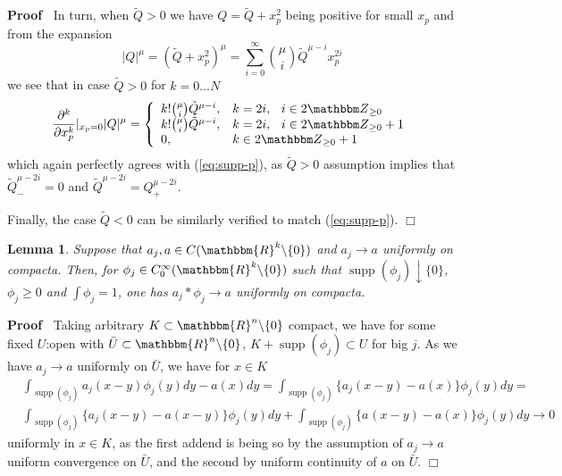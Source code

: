 \documentclass{article}
\newcommand{\tmop}[1]{\ensuremath{\operatorname{#1}}}
\newenvironment{proof}{\noindent\textbf{Proof\ }}{\hspace*{\fill}$\Box$\medskip}
\numberwithin{definition}{section}
\newtheorem{lemma}{Lemma}
\numberwithin{lemma}{section}
\numberwithin{proposition}{section}
{\theorembodyfont{\rmfamily}\newtheorem{remark}{Remark}
\numberwithin{remark}{section}
}
\newcommand{\mybra}[1]{(#1)} \newcommand{\mysbra}[1]{\left[#1\right]}
\begin{document}
\begin{proof}
  In turn, when $\tilde{Q} > 0$ we have $Q = \tilde{Q} + x_p^2$ being positive
  for small $x_p$ and from the expansion
  \[ | Q |^{\mu} = \mybra{\tilde{Q} + x_p^2}^{\mu} = \sum_{i = 0}^{\infty}
     \binom{\mu}{i} \tilde{Q}^{\mu - i} x_p^{2 i} \]
  we see that in case $\tilde{Q} > 0$ for $k = 0 \ldots N$
  \[ \frac{\partial^k}{\partial x_p^k} |_{x_p = 0} | Q |^{\mu} = \left\{
     \begin{array}{ll}
       k! \binom{\mu}{i} \tilde{Q}^{\mu - i}, & k = 2 i, \hspace{0.75em} i \in
       2 \Z_{\ge 0}\\
       k! \binom{\mu}{i} \tilde{Q}^{\mu - i}, & k = 2 i, \hspace{0.75em} i \in
       2 \Z_{\ge 0} + 1\\
       0, & k \in 2 \Z_{\ge 0} + 1
     \end{array} \right. \]
  which again perfectly agrees with (\ref{eq:supp-p}), as $\tilde{Q} > 0$
  assumption implies that $\tilde{Q}^{\mu - 2 i}_- = 0$ and $\tilde{Q}^{\mu -
  2 i} = Q_+^{\mu - 2 i}$.
  
  Finally, the case $\tilde{Q} < 0$ can be similarly verified to match
  (\ref{eq:supp-p}).
\end{proof}

\begin{lemma}
  \label{supp-P:lem-on-compacta}Suppose that $a_j, a \in C ( \mathbbm{R}^k
  \backslash \{ 0 \})$ and $a_j \rightarrow a$ uniformly on compacta. Then,
  for $\phi_j \in C^{\infty}_0 ( \mathbbm{R}^k \backslash \{ 0 \})$ such that
  $\tmop{supp} ( \phi_j) \downarrow \{ 0 \}$, $\phi_j \geqslant 0$ and $\int
  \phi_j = 1$, one has $a_j \ast \phi_j \rightarrow a$ uniformly on compacta.
\end{lemma}

\begin{proof}
  Taking arbitrary $K \subset \mathbbm{R}^n \backslash \{ 0 \}$ compact, we
  have for some fixed $U$:open with $\bar{U} \subset \mathbbm{R}^n \backslash
  \{ 0 \}$, $K + \tmop{supp} ( \phi_j) \subset U$ for big $j$. As we have $a_j
  \rightarrow a$ uniformly on $\bar{U}$, we have for $x \in K$
  \begin{eqnarray}
    & \int_{\tmop{supp} ( \phi_j)} a_j ( x - y) \phi_j ( y) d y - a ( x) d y
    = \int_{\tmop{supp} ( \phi_j)} \{ a_j ( x - y) - a ( x) \} \phi_j ( y) d y
    = &  \nonumber\\
    & \int_{\tmop{supp} ( \phi_j)} \{ a_j ( x - y) - a ( x - y) \} \phi_j (
    y) d y + \int_{\tmop{supp} ( \phi_j)} \{ a_{} ( x - y) - a ( x) \} \phi_j
    ( y) d y \rightarrow 0 &  \nonumber
  \end{eqnarray}
  uniformly in $x \in K$, as the first addend is being so by the assumption of
  $a_j \rightarrow a$ uniform convergence on $\bar{U}$, and the second by
  uniform continuity of $a$ on $\bar{U}$.
\end{proof}
\end{document}
